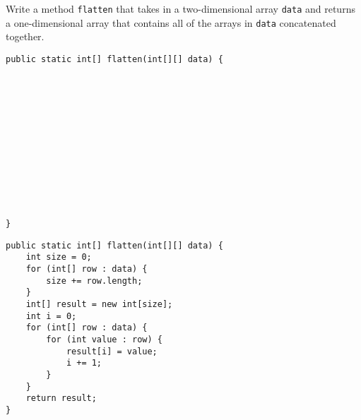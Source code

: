 \question Write a method \texttt{flatten} that takes in a two-dimensional array \texttt{data} and returns a one-dimensional array that contains all of the arrays in \texttt{data} concatenated together.

\ifprintanswers\else
\begin{lstlisting}
public static int[] flatten(int[][] data) {













}
\end{lstlisting}
\fi

\begin{solution}
\begin{lstlisting}
public static int[] flatten(int[][] data) {
    int size = 0;
    for (int[] row : data) {
        size += row.length;
    }
    int[] result = new int[size];
    int i = 0;
    for (int[] row : data) {
        for (int value : row) {
            result[i] = value;
            i += 1;
        }
    }
    return result;
}
\end{lstlisting}
\end{solution}